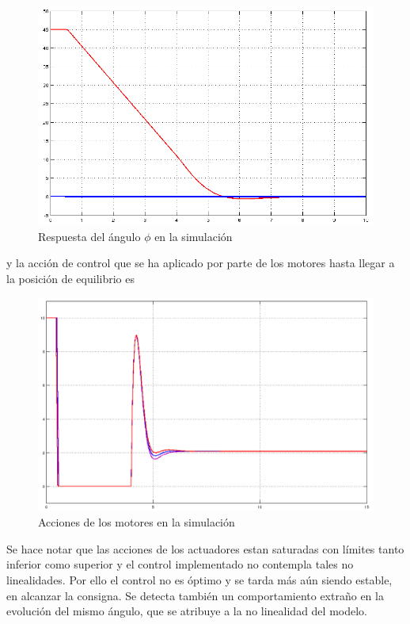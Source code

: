 \documentclass[twoside,11pt]{book}
\begin{document}
\begin{figure}[h!]
\begin{center}
\includegraphics[scale=0.4,bb=0 0 625 400]{images/simulation_2_2.png}
\end{center}
\caption{Respuesta del ángulo $\phi$ en la simulación}
\end{figure}


y la acción de control que se ha aplicado por parte de los motores hasta llegar a la posición de equilibrio es

\begin{figure}[h!]				
\begin{center}
\includegraphics[scale=0.3,bb=0 0 800 550]{images/simulation_1_1.png}
\end{center}
\caption{Acciones de los motores en la simulación}
\end{figure}

Se hace notar que las acciones de los actuadores estan saturadas con límites tanto inferior como superior y el control implementado no contempla tales no linealidades. Por ello el control no es óptimo y se tarda más aún siendo estable, en alcanzar la consigna. Se detecta también un comportamiento extraño en la evolución del mismo ángulo, que se atribuye a la no linealidad del modelo.
	
\end{document}
